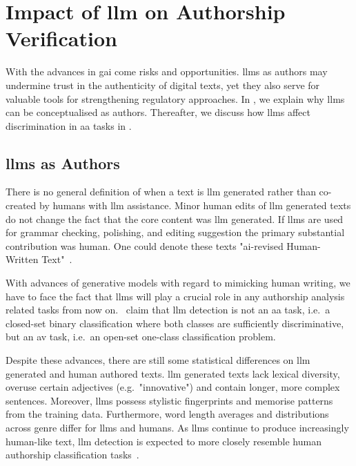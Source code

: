 \section{Impact of \acs{llm} on Authorship Verification}
\label{sec:llm_impact}

With the advances in \ac{gai} come risks and opportunities.
\Acp{llm} as authors may undermine trust in the authenticity of digital texts, yet they also serve for valuable tools for strengthening regulatory approaches.
In , we explain why \acp{llm} can be conceptualised as authors. 
Thereafter, we discuss how \acp{llm} affect discrimination in \ac{aa} tasks in .

\subsection{\acsp{llm} as Authors}
\label{subsec:llm_authors}

There is no general definition of when a text is \ac{llm} generated rather than co-created by humans with \ac{llm} assistance.
Minor human edits of \ac{llm} generated texts do not change the fact that the core content was \ac{llm} generated.
If \acp{llm} are used for grammar checking, polishing, and editing suggestion the primary substantial contribution was human.
One could denote these texts "\acs{ai}-revised Human-Written Text"~\citep{revised_2024}.

With advances of generative models with regard to mimicking human writing, we have to face the fact that \acp{llm} will play a crucial role in any authorship analysis related tasks from now on.
\citet{llm_detection_av_2025}\ claim that \ac{llm} detection is not an \ac{aa} task, i.e.\ a closed-set binary classification where both classes are sufficiently discriminative, but an \ac{av} task, i.e.\ an open-set one-class classification problem. 

Despite these advances, there are still some statistical differences on \ac{llm} generated and human authored texts.
\ac{llm} generated texts lack lexical diversity, overuse certain adjectives (e.g.\ "innovative") and contain longer, more complex sentences.
Moreover, \acp{llm} possess stylistic fingerprints and memorise patterns from the training data.
Furthermore, word length averages and distributions across genre differ for \acp{llm} and humans.
As \acp{llm} continue to produce increasingly human-like text, \ac{llm} detection is expected to more closely resemble human authorship classification tasks~\citep{llm_detection_av_2025}.


